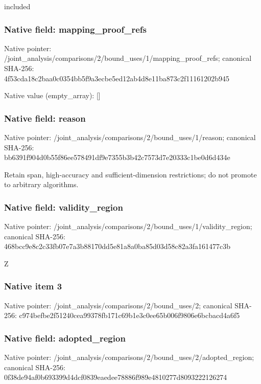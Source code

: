 \documentclass[10pt,a4paper]{article}
\begin{document}
\begingroup\raggedright\sloppy included\par\endgroup

\subsubsection{Native field: mapping\_\allowbreak{}proof\_\allowbreak{}refs}
Native pointer: /joint\_\allowbreak{}analysis/comparisons/2/bound\_\allowbreak{}uses/1/mapping\_\allowbreak{}proof\_\allowbreak{}refs; canonical SHA-256: 4f53cda18c2baa0c0354bb5f9a3ecbe5ed12ab4d8e11ba873c2f11161202b945

Native value (empty\_\allowbreak{}array): []

\subsubsection{Native field: reason}
Native pointer: /joint\_\allowbreak{}analysis/comparisons/2/bound\_\allowbreak{}uses/1/reason; canonical SHA-256: bb6391f904d0b55f86ee578491df9e7355b3b42c7573d7e20333c1be0d6d434e

\begingroup\raggedright\sloppy Retain span,\allowbreak{} high-accuracy and sufficient-dimension restrictions;\allowbreak{} do not promote to arbitrary algorithms.\par\endgroup

\subsubsection{Native field: validity\_\allowbreak{}region}
Native pointer: /joint\_\allowbreak{}analysis/comparisons/2/bound\_\allowbreak{}uses/1/validity\_\allowbreak{}region; canonical SHA-256: 468bcc9e8c2c33fb07e7a3b88170dd5e81a8a0ba85d03d58c82a3fa161477c3b

\begingroup\raggedright\sloppy Z\par\endgroup

\subsubsection{Native item 3}
Native pointer: /joint\_\allowbreak{}analysis/comparisons/2/bound\_\allowbreak{}uses/2; canonical SHA-256: c974befbe2f51240cea99378fb171c69b1e3c0ee65b006f9806e6bcbacd4a6f5

\subsubsection{Native field: adopted\_\allowbreak{}region}
Native pointer: /joint\_\allowbreak{}analysis/comparisons/2/bound\_\allowbreak{}uses/2/adopted\_\allowbreak{}region; canonical SHA-256: 0f38de94af0b693399d4dcf0839eaedee78886f989e4810277d8093222126274
\end{document}
